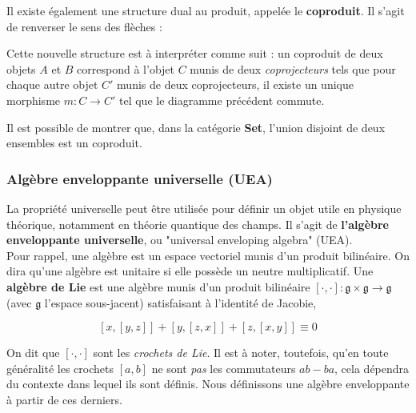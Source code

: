 \documentclass{article}
\begin{document}
Il existe également une structure dual au produit, appelée le \textbf{coproduit}. Il s'agit de renverser le sens des flèches :

\begin{center}
\end{center}

\noindent
Cette nouvelle structure est à interpréter comme suit : un coproduit de deux objets $A$ et $B$ correspond à l'objet $C$ munis de deux \textit{coprojecteurs} tels que pour chaque autre objet $C'$ munis de deux coprojecteurs, il existe un unique morphisme $m:C\to C'$ tel que le diagramme précédent commute.

\begin{example}[]{}
    Il est possible de montrer que, dans la catégorie \textbf{Set}, l'union disjoint de deux ensembles est un coproduit.
\end{example}

\subsubsection{Algèbre enveloppante universelle (UEA)}
La propriété universelle peut être utilisée pour définir un objet utile en physique théorique, notamment en théorie quantique des champs. Il s'agit de \textbf{l'algèbre enveloppante universelle}, ou "universal enveloping algebra" (UEA).\\

Pour rappel, une algèbre est un espace vectoriel munis d'un produit bilinéaire. On dira qu'une algèbre est unitaire si elle possède un neutre multiplicatif. Une \textbf{algèbre de Lie} est une algèbre munis d'un produit bilinéaire $[\cdot,\cdot]:\mathfrak{g}\times\mathfrak{g}\to\mathfrak{g}$ (avec $\mathfrak{g}$ l'espace sous-jacent) satisfaisant à l'identité de Jacobie,

$$
[x, [y, z]] + [y, [z, x]] + [z, [x, y]]\equiv0
$$

\noindent
On dit que $[\cdot, \cdot]$ sont les \textit{crochets de Lie}. Il est à noter, toutefois, qu'en toute généralité les crochets $[a,b]$ ne sont \textit{pas} les commutateurs $ab-ba$, cela dépendra du contexte dans lequel ils sont définis. Nous définissons une algèbre enveloppante à partir de ces derniers.
\end{document}
